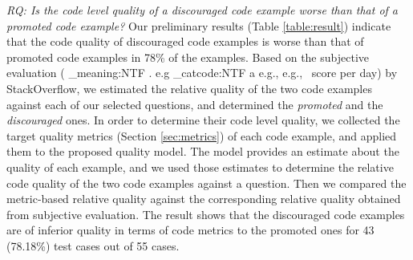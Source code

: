 \documentclass[conference]{IEEEtran}
\makeatletter
\newcommand\latinabbrev[1]{
  \peek_meaning:NTF . {%
    #1\@}%
  { \peek_catcode:NTF a {%
      #1., \@ }%
    {#1., \@}}}
\def\eg{\latinabbrev{e.g}}
\makeatother
\begin{document}
\begin{table}
\centering
\caption{Metrics Correlation}\label{table:correlation}
\vspace{-.5cm}
\end{table}






\emph{RQ: Is the code level quality of a discouraged code example worse than that of a promoted code example?} Our preliminary results (Table \ref{table:result}) indicate that the code quality of discouraged code examples is worse than that of promoted code examples in 78\% of the examples. Based on the subjective evaluation (\eg\ score per day) by StackOverflow, we estimated the relative quality of the two code examples against each of our selected questions, and determined the \emph{promoted} and the \emph{discouraged} ones. In order to determine their code level quality, we collected the target quality metrics (Section \ref{sec:metrics}) of each code example, and applied them to the proposed quality model. The model provides an estimate about the quality of each example, and we used those estimates to determine the relative code quality of the two code examples against a question. Then we compared the metric-based relative quality against the corresponding relative quality obtained from subjective evaluation. The result shows that the discouraged code examples are of inferior quality in terms of code metrics to the promoted ones for 43 (78.18\%) test cases out of 55 cases.
\end{document}
